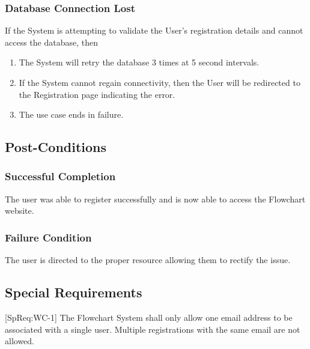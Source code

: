 \documentclass[a4paper,11pt]{article}
\begin{document}
\subsubsection{Database Connection Lost}
If the System is attempting to validate the User's registration details and cannot access the database, then
\begin{enumerate}
\item The System will retry the database 3 times at 5 second intervals.
\item If the System cannot regain connectivity, then the User will be redirected to the Registration page indicating the error.
\item The use case ends in failure.
\end{enumerate}

\subsection{Post-Conditions}
\subsubsection{Successful Completion}
The user was able to register successfully and is now able to access the Flowchart website.

\subsubsection{Failure Condition}
The user is directed to the proper resource allowing them to rectify the issue.

\subsection{Special Requirements}
[SpReq:WC-1] The Flowchart System shall only allow one email address to be associated with a single user. Multiple registrations with the same email are not allowed.
\end{document}
